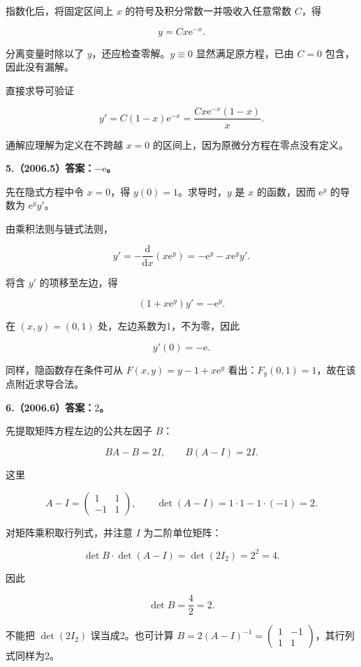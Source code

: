 \documentclass[UTF8,11pt,fontset=windows]{ctexart}
\begin{document}
指数化后，将固定区间上 $x$ 的符号及积分常数一并吸收入任意常数 $C$，得

$$
\boxed{y=Cx\mathrm e^{-x}.}
$$

分离变量时除以了 $y$，还应检查零解。$y\equiv0$ 显然满足原方程，已由 $C=0$ 包含，因此没有漏解。

直接求导可验证

$$
y'=C(1-x)\mathrm e^{-x}
=\frac{Cx\mathrm e^{-x}(1-x)}x.
$$

通解应理解为定义在不跨越 $x=0$ 的区间上，因为原微分方程在零点没有定义。

\clearpage

\textbf{5.（2006.5）答案：$-\mathrm e$。}

先在隐式方程中令 $x=0$，得 $y(0)=1$。求导时，$y$ 是 $x$ 的函数，因而 $\mathrm e^y$ 的导数为 $\mathrm e^y y'$。

由乘积法则与链式法则，

$$
y'=-\frac{\mathrm d}{\mathrm dx}(x\mathrm e^y)
=-\mathrm e^y-x\mathrm e^y y'.
$$

将含 $y'$ 的项移至左边，得

$$
(1+x\mathrm e^y)y'=-\mathrm e^y.
$$

在 $(x,y)=(0,1)$ 处，左边系数为1，不为零，因此

$$
\boxed{y'(0)=-\mathrm e.}
$$

同样，隐函数存在条件可从 $F(x,y)=y-1+x\mathrm e^y$ 看出：$F_y(0,1)=1$，故在该点附近求导合法。

\clearpage

\textbf{6.（2006.6）答案：$2$。}

先提取矩阵方程左边的公共左因子 $B$：

$$
BA-B=2I,\qquad B(A-I)=2I.
$$

这里

$$
A-I=\begin{pmatrix}1&1\\-1&1\end{pmatrix},
\qquad
\det(A-I)=1\cdot1-1\cdot(-1)=2.
$$

对矩阵乘积取行列式，并注意 $I$ 为二阶单位矩阵：

$$
\det B\cdot\det(A-I)=\det(2I_2)=2^2=4.
$$

因此

$$
\boxed{\det B=\frac42=2.}
$$

不能把 $\det(2I_2)$ 误当成2。也可计算 $B=2(A-I)^{-1}=\begin{pmatrix}1&-1\\1&1\end{pmatrix}$，其行列式同样为2。
\end{document}
